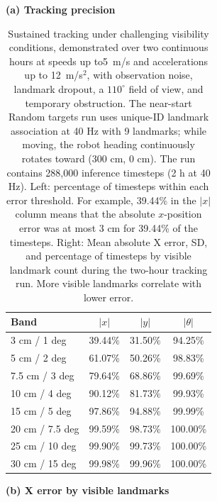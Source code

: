 \begin{table}[!htbp]
    \centering
    \caption{\scriptsize Sustained tracking under challenging visibility conditions, demonstrated over two continuous hours at speeds up to5~m/s and accelerations up to 12~m/s$^2$, with observation noise, landmark dropout, a $110^\circ$ field of view, and temporary obstruction. The near-start Random targets run uses unique-ID landmark association at 40 Hz with 9 landmarks; while moving, the robot heading continuously rotates toward (300 cm, 0 cm). The run contains 288,000 inference timesteps (2 h at 40 Hz). Left: percentage of timesteps within each error threshold. For example, 39.44\% in the \(|x|\) column means that the absolute \(x\)-position error was at most 3 cm for 39.44\% of the timesteps. Right: Mean absolute X error, SD, and percentage of timesteps by visible landmark count during the two-hour tracking run. More visible landmarks correlate with lower error.}
    \label{tab:visibility-stress-tracking-summary}
    \scriptsize
    \begin{minipage}[t]{0.49\linewidth}
        \centering
        \textbf{(a) Tracking precision}\\[0.25em]
        \setlength{\tabcolsep}{5pt}
        \begin{tabular}{lccc}
            \toprule
            Band & $|x|$ & $|y|$ & $|\theta|$ \\
            \midrule
            3 cm / 1 deg & 39.44\% & 31.50\% & 94.25\% \\
            5 cm / 2 deg & 61.07\% & 50.26\% & 98.83\% \\
            7.5 cm / 3 deg & 79.64\% & 68.86\% & 99.69\% \\
            10 cm / 4 deg & 90.12\% & 81.73\% & 99.93\% \\
            15 cm / 5 deg & 97.86\% & 94.88\% & 99.99\% \\
            20 cm / 7.5 deg & 99.59\% & 98.73\% & 100.00\% \\
            25 cm / 10 deg & 99.90\% & 99.73\% & 100.00\% \\
            30 cm / 15 deg & 99.98\% & 99.96\% & 100.00\% \\
            \bottomrule
        \end{tabular}
    \end{minipage}
    \hfill
       \begin{minipage}[t]{0.49\linewidth}
        \centering
       \textbf{(b) X error by visible landmarks}\\[0.25em]

\end{minipage}
\end{table}
